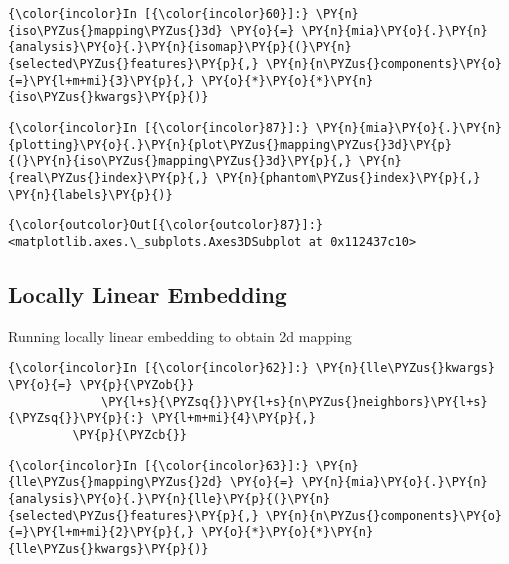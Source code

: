     \begin{Verbatim}[commandchars=\\\{\}]
{\color{incolor}In [{\color{incolor}60}]:} \PY{n}{iso\PYZus{}mapping\PYZus{}3d} \PY{o}{=} \PY{n}{mia}\PY{o}{.}\PY{n}{analysis}\PY{o}{.}\PY{n}{isomap}\PY{p}{(}\PY{n}{selected\PYZus{}features}\PY{p}{,} \PY{n}{n\PYZus{}components}\PY{o}{=}\PY{l+m+mi}{3}\PY{p}{,} \PY{o}{*}\PY{o}{*}\PY{n}{iso\PYZus{}kwargs}\PY{p}{)}
\end{Verbatim}

    \begin{Verbatim}[commandchars=\\\{\}]
{\color{incolor}In [{\color{incolor}87}]:} \PY{n}{mia}\PY{o}{.}\PY{n}{plotting}\PY{o}{.}\PY{n}{plot\PYZus{}mapping\PYZus{}3d}\PY{p}{(}\PY{n}{iso\PYZus{}mapping\PYZus{}3d}\PY{p}{,} \PY{n}{real\PYZus{}index}\PY{p}{,} \PY{n}{phantom\PYZus{}index}\PY{p}{,} \PY{n}{labels}\PY{p}{)}
\end{Verbatim}

            \begin{Verbatim}[commandchars=\\\{\}]
{\color{outcolor}Out[{\color{outcolor}87}]:} <matplotlib.axes.\_subplots.Axes3DSubplot at 0x112437c10>
\end{Verbatim}

    \subsection{Locally Linear Embedding}\label{locally-linear-embedding}

Running locally linear embedding to obtain 2d mapping

    \begin{Verbatim}[commandchars=\\\{\}]
{\color{incolor}In [{\color{incolor}62}]:} \PY{n}{lle\PYZus{}kwargs} \PY{o}{=} \PY{p}{\PYZob{}}
             \PY{l+s}{\PYZsq{}}\PY{l+s}{n\PYZus{}neighbors}\PY{l+s}{\PYZsq{}}\PY{p}{:} \PY{l+m+mi}{4}\PY{p}{,}
         \PY{p}{\PYZcb{}}
\end{Verbatim}

    \begin{Verbatim}[commandchars=\\\{\}]
{\color{incolor}In [{\color{incolor}63}]:} \PY{n}{lle\PYZus{}mapping\PYZus{}2d} \PY{o}{=} \PY{n}{mia}\PY{o}{.}\PY{n}{analysis}\PY{o}{.}\PY{n}{lle}\PY{p}{(}\PY{n}{selected\PYZus{}features}\PY{p}{,} \PY{n}{n\PYZus{}components}\PY{o}{=}\PY{l+m+mi}{2}\PY{p}{,} \PY{o}{*}\PY{o}{*}\PY{n}{lle\PYZus{}kwargs}\PY{p}{)}
\end{Verbatim}

